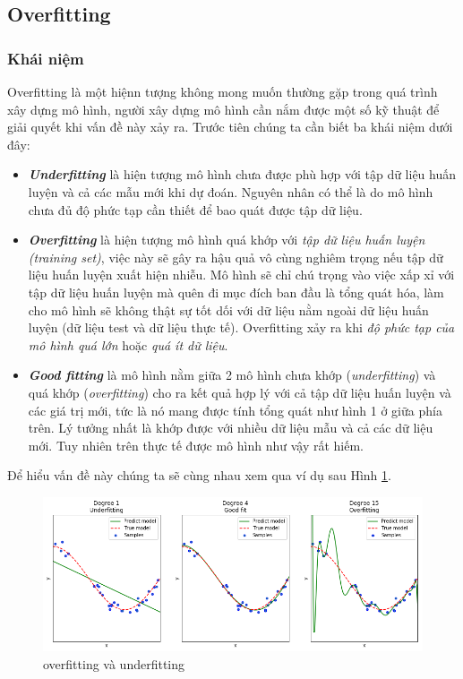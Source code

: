 \subsection{Overfitting}
\subsubsection{Khái niệm}
  Overfitting là một hiệnn tượng không mong muốn thường gặp trong quá trình xây dựng mô hình, người xây dựng mô hình cần nắm được một số kỹ thuật để giải quyết khi vấn đề này xảy ra. Trước tiên chúng ta cần biết ba khái niệm dưới đây:
\begin{itemize}
\item []
\textit{\textbf{Underfitting}} là hiện tượng mô hình chưa được phù hợp với tập dữ liệu huấn luyện và cả các mẫu mới khi dự đoán. Nguyên nhân có thể là do mô hình chưa đủ độ phức tạp cần thiết để bao quát được tập dữ liệu.
\item []
\textit{\textbf{Overfitting}} là hiện tượng mô hình quá khớp với \textit{tập dữ liệu huấn luyện (training set)}, việc này sẽ gây ra hậu quả vô cùng nghiêm trọng nếu tập dữ liệu huấn luyện xuất hiện nhiễu. Mô hình sẽ chỉ chú trọng vào việc xấp xỉ với tập dữ liệu huấn luyện mà quên đi mục đích ban đầu là tổng quát hóa, làm cho mô hình sẽ không thật sự tốt dối với dữ liệu nằm ngoài dữ liệu huấn luyện (dữ liệu test và dữ liệu thực tế). Overfitting xảy ra khi \textit{độ phức tạp của mô hình quá lớn} hoặc \textit{quá ít dữ liệu}.
\item []
\textit{\textbf{Good fitting}} là mô hình nằm giữa 2 mô hình chưa khớp (\textit{underfitting}) và quá khớp (\textit{overfitting}) cho ra kết quả hợp lý với cả tập dữ liệu huấn luyện và các giá trị mới, tức là nó mang được tính tổng quát như hình 1 ở giữa phía trên. Lý tưởng nhất là khớp được với nhiều dữ liệu mẫu và cả các dữ liệu mới. Tuy nhiên trên thực tế được mô hình như vậy rất hiếm.
\end{itemize}
  Để hiểu vấn đề này chúng ta sẽ cùng nhau xem qua ví dụ sau  Hình \ref{fig:overfitting}.
\begin{center}
 	\begin{figure}[H]
    \begin{center}
    \includegraphics[scale=0.5]{chap3/image/overfitting.png}
    \end{center}
    \caption{overfitting và underfitting}
    \label{fig:overfitting}
    \end{figure}
\end{center}
